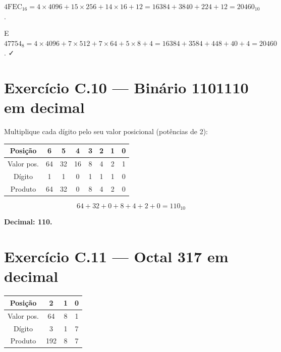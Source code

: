 \documentclass[11pt,a4paper]{article}
\begin{document}
$\text{4FEC}_{16} = 4 \times 4096 + 15 \times 256 + 14 \times 16 + 12 = 16384 + 3840 + 224 + 12 = 20460_{10}$.

E $47754_8 = 4 \times 4096 + 7 \times 512 + 7 \times 64 + 5 \times 8 + 4 = 16384 + 3584 + 448 + 40 + 4 = 20460$. ✓

\section{Exerc\'icio C.10 --- Bin\'ario 1101110 em decimal}

Multiplique cada d\'igito pelo seu valor posicional (pot\^encias de 2):

\begin{center}
\renewcommand{\arraystretch}{1.2}
\begin{tabular}{|c|c|c|c|c|c|c|c|}
\hline
Posi\c{c}\~ao    & 6   & 5  & 4  & 3 & 2 & 1 & 0 \\
\hline
Valor pos. & 64  & 32 & 16 & 8 & 4 & 2 & 1 \\
\hline
D\'igito    & 1   & 1  & 0  & 1 & 1 & 1 & 0 \\
\hline
Produto   & 64  & 32 & 0  & 8 & 4 & 2 & 0 \\
\hline
\end{tabular}
\end{center}

\[
64 + 32 + 0 + 8 + 4 + 2 + 0 = \boxed{110_{10}}
\]

\begin{resposta}\textbf{Decimal: 110.}\end{resposta}

\section{Exerc\'icio C.11 --- Octal 317 em decimal}

\begin{center}
\renewcommand{\arraystretch}{1.2}
\begin{tabular}{|c|c|c|c|}
\hline
Posi\c{c}\~ao    & 2   & 1  & 0 \\
\hline
Valor pos. & 64  & 8  & 1 \\
\hline
D\'igito    & 3   & 1  & 7 \\
\hline
Produto   & 192 & 8  & 7 \\
\hline
\end{tabular}
\end{center}
\end{document}
